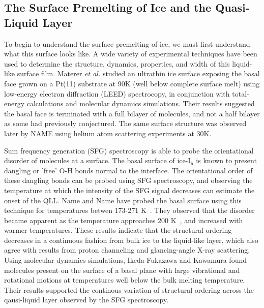 \subsection{The Surface Premelting of Ice and the Quasi-Liquid Layer}





To begin to understand the surface premelting of ice, we must first
understand what this surface looks like. A wide variety of
experimental techniques have been used to determine the structure,
dynamics, properties, and width of this liquid-like surface film.
Materer \textit{et al.} studied an ultrathin ice surface exposing the
basal face grown on a Pt(11) substrate at 90K (well below complete
surface melt) using low-energy electron diffraction (LEED)
spectrocopy, in conjunction with total-energy calculations and
molecular dynamics simulations.\cite{Materer1995,Materer1997} Their results suggested
the basal face is terminated with a full bilayer of molecules, and not
a half bilayer as some had previously conjectured. The same surface
structure was observed later by NAME using helium atom scattering
experiments at 30K.\cite{Braun1998,Glebov2000}

Sum frequency generation (SFG) spectroscopy is able to probe the
orientational disorder of molecules at a surface. The basal surface of
ice-I$_\mathrm{h}$ is known to present dangling or 'free' O-H bonds
normal to the interface. The orientational order of these dangling
bonds can be probed using SFG spectroscopy, and observing the
temperature at which the intensity of the SFG signal decreases can
estimate the onset of the QLL. Name and Name have probed the basal
surface using this technique for temperatures betwen 173-271
K~.\cite{Wei2001,Wei2002} They observed that the disorder became apparent
as the temperature approaches 200 K~, and increased with warmer
temperatures.  These results indicate that the structural ordering
decreases in a continuous fashion from bulk ice to the liquid-like
layer, which also agree with results from proton channeling and
glancing-angle X-ray scattering.\cite{Golecki1978,Dosch1995} Using
molecular dynamics simulations, Ikeda-Fukazawa and Kawamura found
molecules present on the surface of a basal plane with large
vibrational and rotational motions at temperatures well below the bulk
melting temperature.\cite{Ikeda-Fukazawa2004} Their results supported
the continous variation of structural ordering across the qausi-liquid
layer observed by the SFG spectroscopy.



